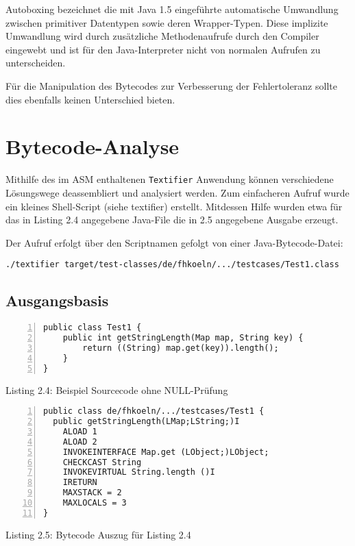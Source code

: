 \vspace{0.3cm}

Autoboxing bezeichnet die mit Java 1.5 eingeführte automatische Umwandlung zwischen
primitiver Datentypen sowie deren Wrapper-Typen. Diese implizite Umwandlung wird
durch zusätzliche Methodenaufrufe durch den Compiler eingewebt und ist für den
Java-Interpreter nicht von normalen Aufrufen zu unterscheiden.

Für die Manipulation des Bytecodes zur Verbesserung der Fehlertoleranz sollte
dies ebenfalls keinen Unterschied bieten.


\section{Bytecode-Analyse}

Mithilfe des im ASM enthaltenen \texttt{Textifier} Anwendung können verschiedene Lösungswege
deassembliert und analysiert werden. Zum einfacheren Aufruf wurde ein kleines Shell-Script
(siehe textifier) erstellt. Mitdessen Hilfe wurden etwa für das in Listing 2.4 angegebene
Java-File die in 2.5 angegebene Ausgabe erzeugt.

Der Aufruf erfolgt über den Scriptnamen gefolgt von einer Java-Bytecode-Datei:

\vspace{0.3cm}

\texttt{./textifier target/test-classes/de/fhkoeln/.../testcases/Test1.class}


\subsection{Ausgangsbasis}

\begin{lstlisting}[basicstyle=\ttfamily,numbers=left,numberstyle=\footnotesize\ttfamily,backgroundcolor=\color{source}]
public class Test1 {
	public int getStringLength(Map map, String key) {
		return ((String) map.get(key)).length();
	}
}
\end{lstlisting}
\centerline{Listing 2.4: Beispiel Sourcecode ohne NULL-Prüfung}

\vspace{0.3cm}


\begin{lstlisting}[basicstyle=\ttfamily,numbers=left,numberstyle=\footnotesize\ttfamily,backgroundcolor=\color{source}]
public class de/fhkoeln/.../testcases/Test1 {
  public getStringLength(LMap;LString;)I
    ALOAD 1
    ALOAD 2
    INVOKEINTERFACE Map.get (LObject;)LObject;
    CHECKCAST String
    INVOKEVIRTUAL String.length ()I
    IRETURN
    MAXSTACK = 2
    MAXLOCALS = 3
}
\end{lstlisting}
\centerline{Listing 2.5: Bytecode Auszug für Listing 2.4}

